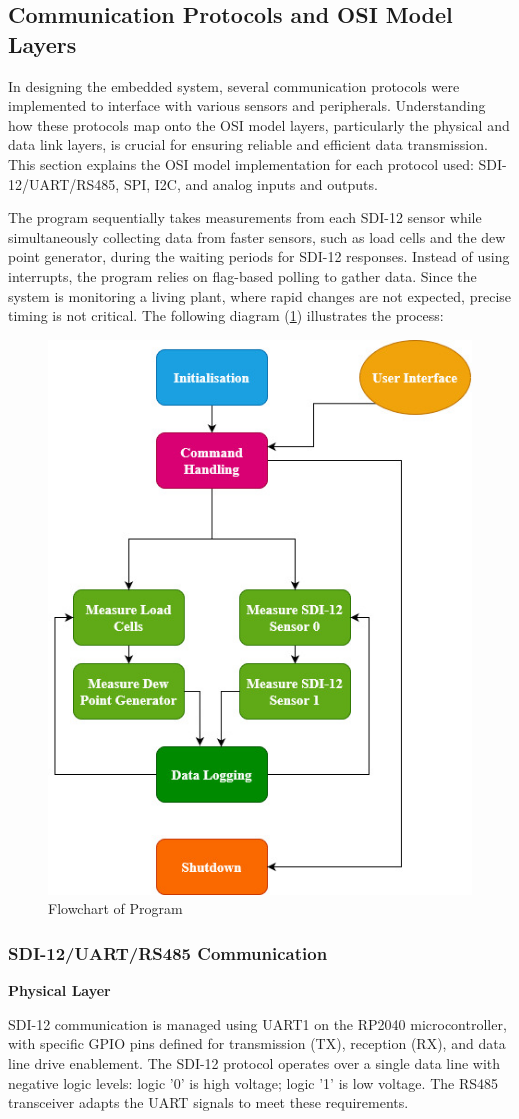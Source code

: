 \subsection{Communication Protocols and OSI Model Layers}

In designing the embedded system, several communication protocols were implemented 
to interface with various sensors and peripherals. Understanding how these protocols 
map onto the OSI model layers, particularly the physical and data link layers, is 
crucial for ensuring reliable and efficient data transmission. This section explains 
the OSI model implementation for each protocol used: SDI-12/UART/RS485, SPI, I2C, 
and analog inputs and outputs.

The program sequentially takes measurements from each SDI-12 sensor while simultaneously 
collecting data from faster sensors, such as load cells and the dew point generator, during 
the waiting periods for SDI-12 responses. Instead of using interrupts, the program relies 
on flag-based polling to gather data. Since the system is monitoring a living plant, 
where rapid changes are not expected, precise timing is not critical. The following 
diagram (\cref{flowchart})  illustrates the process: 

\begin{figure}
    \centering
    \includegraphics[width=0.4\linewidth]{figures/program_flowchart.jpg}
    \caption{Flowchart of Program}
    \label{flowchart}
\end{figure}

\subsubsection{SDI-12/UART/RS485 Communication}

\textbf{Physical Layer}

SDI-12 communication is managed using UART1 on the RP2040 microcontroller, with specific 
GPIO pins defined for transmission (TX), reception (RX), and data line drive enablement. The SDI-12 protocol operates over a single data line with negative logic levels: logic '0' is high voltage; logic '1' is low voltage. The RS485 transceiver adapts the UART signals to meet these requirements.

